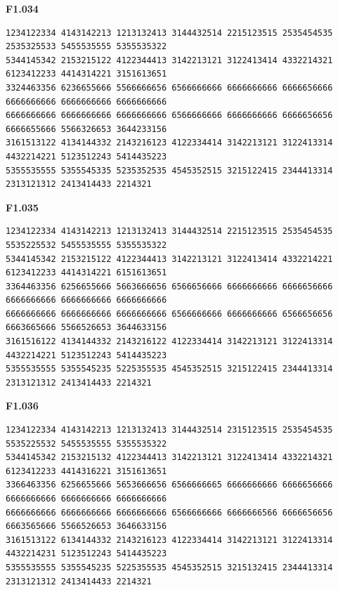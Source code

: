 \noindent\begin{minipage}{\linewidth}\textbf{F1.034}
\begin{lstlisting}
1234122334 4143142213 1213132413 3144432514 2215123515 2535454535 2535325533 5455535555 5355535322
5344145342 2153215122 4122344413 3142213121 3122413414 4332214321 6123412233 4414314221 3151613651
3324463356 6236655666 5566666656 6566666666 6666666666 6666656666 6666666666 6666666666 6666666666
6666666666 6666666666 6666666666 6566666666 6666666666 6666656656 6666655666 5566326653 3644233156
3161513122 4134144332 2143216123 4122334414 3142213121 3122413314 4432214221 5123512243 5414435223
5355535555 5355545335 5235352535 4545352515 3215122415 2344413314 2313121312 2413414433 2214321
\end{lstlisting}
\end{minipage}\par\smallskip

\noindent\begin{minipage}{\linewidth}\textbf{F1.035}
\begin{lstlisting}
1234122334 4143142213 1213132413 3144432514 2215123515 2535454535 5535225532 5455535555 5355535322
5344145342 2153215122 4122344413 3142213121 3122413414 4332214221 6123412233 4414314221 6151613651
3364463356 6256655666 5663666656 6566656666 6666666666 6666656666 6666666666 6666666666 6666666666
6666666666 6666666666 6666666666 6566666666 6666666666 6566656656 6663665666 5566526653 3644633156
3161516122 4134144332 2143216122 4122334414 3142213121 3122413314 4432214221 5123512243 5414435223
5355535555 5355545235 5225355535 4545352515 3215122415 2344413314 2313121312 2413414433 2214321
\end{lstlisting}
\end{minipage}\par\smallskip

\noindent\begin{minipage}{\linewidth}\textbf{F1.036}
\begin{lstlisting}
1234122334 4143142213 1213132413 3144432514 2315123515 2535454535 5535225532 5455535555 5355535322
5344145342 2153215132 4122344413 3142213121 3122413414 4332214321 6123412233 4414316221 3151613651
3366463356 6256655666 5653666656 6566666665 6666666666 6666656666 6666666666 6666666666 6666666666
6666666666 6666666666 6666666666 6566666666 6666666566 6666656656 6663565666 5566526653 3646633156
3161513122 6134144332 2143216123 4122334414 3142213121 3122413314 4432214231 5123512243 5414435223
5355535555 5355545235 5225355535 4545352515 3215132415 2344413314 2313121312 2413414433 2214321
\end{lstlisting}
\end{minipage}\par\smallskip

